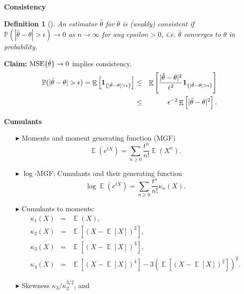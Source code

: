 \documentclass[19pt,landscape]{article}
\newtheorem{defi}[thm]{Definition}
\newcommand{\IP}{\mathbb{P}}
\newcommand{\bone}{{\bf 1}}
\DeclareMathOperator{\E}{\mathbb{E}}
\begin{document}
\newpage
{\LARGE\centerline{\textbf{Consistency}}}
\vskip25pt
\begin{minipage}{.9\textwidth}
    \Large 
\begin{defi}[\cite{garthwaite02}]
    An estimator $\hat{\theta}$ for $\theta$ is (weakly) consistent if $\IP(|\hat{\theta}-\theta|>\epsilon)\to0$ as $n\to\infty$ for any $epsilon>0$, i.e. $\hat{\theta}$ converges to $\theta$ in probability.
\end{defi} 
{\bf Claim:} ${\rm MSE}\{\hat{\theta}\}\to0$ implies consistency. 
\begin{eqnarray*}
    \IP(|\hat{\theta}-\theta|>\epsilon)=\E\left[\bone_{\{|\hat{\theta}-\theta|>\epsilon\}}\right]&\le&\E\left[\frac{|\hat{\theta}-\theta|^2}{\epsilon^2}\bone_{\{|\hat{\theta}-\theta|>\epsilon\}}\right]\\
    &\le&\epsilon^{-2}\E\left[|\hat{\theta}-\theta|^2\right].
\end{eqnarray*}
\end{minipage}

\newpage
{\LARGE\centerline{\textbf{Cumulants}}}
\vskip25pt
\begin{minipage}{.9\textwidth}
    \large 
  \begin{itemize}
    \item[$\blacktriangleright$] Moments and moment generating function (MGF)
    \begin{equation*}
        \E\left(e^{tX}\right)=\sum_{n\ge0}\frac{t^n}{n!}\E(X^n).
    \end{equation*}
    \item[$\blacktriangleright$] $\log$-MGF: Cumulants and their generating function
\begin{equation*}
    \log\E\left(e^{tX}\right)=\sum_{n\ge0}\frac{t^n}{n!}\kappa_n(X).
\end{equation*}
    \item[$\blacktriangleright$] Cumulants to moments:
\begin{eqnarray}
    \kappa_1(X)&=&\E(X),\nonumber\\
    \kappa_2(X)&=&\E[(X-\E[X])^2],\nonumber\\
    \kappa_3(X)&=&\E[(X-\E[X])^3],\nonumber\\
    \kappa_4(X)&=&\E[(X-\E[X])^4]-3(\E[(X-\E[X])^2])^2.\nonumber
\end{eqnarray}
    \item[$\blacktriangleright$] Skewness  $\kappa_3/\kappa_2^{3/2}$, and 
  \end{itemize}
\end{minipage}
\end{document}
